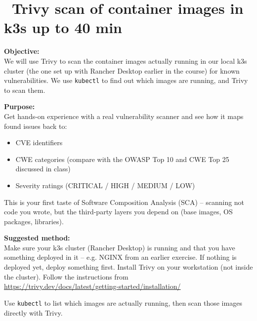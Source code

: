 \documentclass[a4paper,11pt,notitlepage]{report}
\begin{document}
\chapter{\faInfoCircle\ Trivy scan of container images in k3s up to 40 min}
\label{ex:sw-trivy-k3s}
{\bf Objective:}\\
We will use Trivy to scan the container images actually running in our local k3s cluster (the one set up with Rancher Desktop earlier in the course) for known vulnerabilities. We use \verb+kubectl+ to find out which images are running, and Trivy to scan them.

{\bf Purpose:}\\
Get hands-on experience with a real vulnerability scanner and see how it maps found issues back to:
\begin{itemize}
  \item CVE identifiers
  \item CWE categories (compare with the OWASP Top 10 and CWE Top 25 discussed in class)
  \item Severity ratings (CRITICAL / HIGH / MEDIUM / LOW)
\end{itemize}
This is your first taste of Software Composition Analysis (SCA) -- scanning not code you wrote, but the third-party layers you depend on (base images, OS packages, libraries).

{\bf Suggested method:}\\
Make sure your k3s cluster (Rancher Desktop) is running and that you have something deployed in it -- e.g. NGINX from an earlier exercise. If nothing is deployed yet, deploy something first.
Install Trivy on your workstation (not inside the cluster). Follow the instructions from\\
 \url{https://trivy.dev/docs/latest/getting-started/installation/}

Use \verb+kubectl+ to list which images are actually running, then scan those images directly with Trivy.
\end{document}

